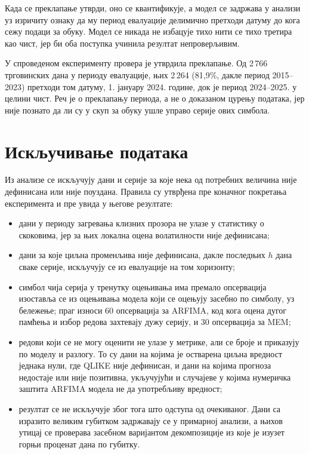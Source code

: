 Када се преклапање утврди, оно се квантификује, а модел се задржава у
анализи уз изричиту ознаку да му период евалуације делимично претходи датуму до кога
сежу подаци за обуку. Модел се никада не избацује тихо нити се тихо третира као чист, јер би оба
поступка учинила резултат непроверљивим.

У спроведеном експерименту провера је утврдила преклапање. Од 2\,766 трговинских дана
у периоду евалуације, њих 2\,264 (81,9\%, дакле период 2015–2023) претходи том датуму,
1. јануару 2024. године, док је период 2024–2025. у целини чист.
Реч је о преклапању периода, а не о доказаном цурењу података, јер није познато да ли
су у скуп за обуку ушле управо серије ових симбола.

\section{Искључивање података}
\label{sec:iskljucivanje}

Из анализе се искључују дани и серије за које нека од потребних величина није
дефинисана или није поуздана. Правила су утврђена пре коначног покретања експеримента
и пре увида у његове резултате:

\begin{itemize}
\item дани у периоду загревања клизних прозора не улазе у статистику о скоковима, јер
      за њих локална оцена волатилности није дефинисана;
\item дани за које циљна променљива није дефинисана, дакле последњих $h$ дана сваке
      серије, искључују се из евалуације на том хоризонту;
\item симбол чија серија у тренутку оцењивања има премало опсервација изоставља се из
      оцењивања модела који се оцењују засебно по симболу, уз бележење; праг износи 60
      опсервација за ARFIMA, код кога оцена дугог памћења и избор редова захтевају дужу
      серију, и 30 опсервација за MEM;
\item редови који се не могу оценити не улазе у метрике, али се броје и приказују по
      моделу и разлогу. То су дани на којима је остварена циљна вредност једнака нули,
      где QLIKE није дефинисан, и дани на којима прогноза недостаје или није позитивна,
      укључујући и случајеве у којима нумеричка заштита ARFIMA модела не да употребљиву
      вредност;
\item резултат се не искључује због тога што одступа од очекиваног. Дани са
      изразито великим губитком задржавају се у примарној анализи, а њихов утицај се
      проверава засебном варијантом декомпозиције из које је изузет горњи проценат дана
      по губитку.
\end{itemize}

